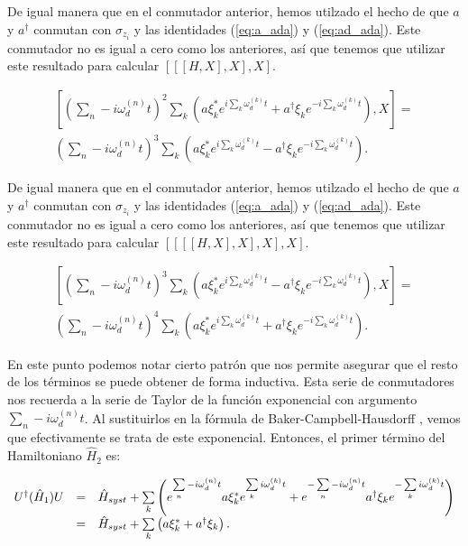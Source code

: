 De igual manera que en el conmutador anterior, hemos utilzado el hecho de que $a$ y $a^\dagger$ conmutan con $\sigma_{z_i}$ y las identidades (\ref{eq:a_ada}) y (\ref{eq:ad_ada}). Este conmutador no es igual a cero como los anteriores, así que tenemos que utilizar este resultado para calcular $[[[H,X],X],X]$.

\begin{multline}
    \left[\left(\sum\limits_n-i \omega_d^{(n)} t\right)^2 \sum\limits_k \left(a\xi_k^*e^{i\sum\limits_k \omega_d^{(k)}t}+ a^\dagger\xi_ke^{-i\sum\limits_k \omega_d^{(k)}t}\right), X\right] = \\
    \left(\sum\limits_n-i \omega_d^{(n)} t\right)^3 \sum\limits_k \left(a\xi_k^*e^{i\sum\limits_k \omega_d^{(k)}t} - a^\dagger\xi_ke^{-i\sum\limits_k \omega_d^{(k)}t}\right) .
\end{multline}

De igual manera que en el conmutador anterior, hemos utilzado el hecho de que $a$ y $a^\dagger$ conmutan con $\sigma_{z_i}$ y las identidades (\ref{eq:a_ada}) y (\ref{eq:ad_ada}). Este conmutador no es igual a cero como los anteriores, así que tenemos que utilizar este resultado para calcular $[[[[H,X],X],X],X]$.

\begin{multline}
    \left[\left(\sum\limits_n-i \omega_d^{(n)} t\right)^3 \sum\limits_k \left(a\xi_k^*e^{i\sum\limits_k \omega_d^{(k)}t} - a^\dagger\xi_ke^{-i\sum\limits_k \omega_d^{(k)}t}\right), X\right] = \\
    \left(\sum\limits_n-i \omega_d^{(n)} t\right)^4 \sum\limits_k \left(a\xi_k^*e^{i\sum\limits_k \omega_d^{(k)}t} + a^\dagger\xi_ke^{-i\sum\limits_k \omega_d^{(k)}t}\right) .
\end{multline}

En este punto podemos notar cierto patrón que nos permite asegurar que el resto de los términos se puede obtener de forma inductiva. Esta serie de conmutadores nos recuerda a la serie de Taylor de la función exponencial con argumento $\sum\limits_n-i \omega_d^{(n)} t$. Al sustituirlos en la fórmula de Baker-Campbell-Hausdorff \cite{Louisell_1973}, vemos que efectivamente se trata de este exponencial. Entonces, el primer término del Hamiltoniano $\hat{H}_2$ es:

\begin{equation}
    \begin{array}{r c l}
        U^\dagger (\hat{H}_1) U &=& \hat{H}_{syst} + \sum\limits_k \left(e^{\sum\limits_n-i \omega_d^{(n)} t} a\xi_k^*e^{\sum\limits_k i\omega_d^{(k)}t}+ e^{-\sum\limits_n-i \omega_d^{(n)} t} a^\dagger\xi_ke^{-\sum\limits_k i\omega_d^{(k)}t}\right) \\
                                &=& \hat{H}_{syst} + \sum\limits_k \left(a\xi_k^* + a^\dagger\xi_k\right) .
    \end{array}
\end{equation}

